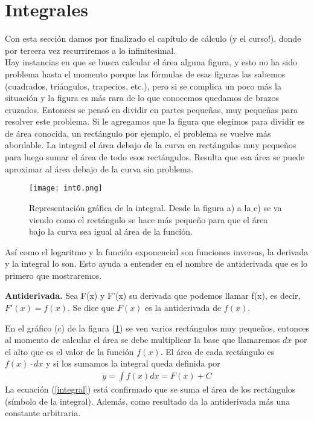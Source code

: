 \section{Integrales}

Con esta sección damos por finalizado el capítulo de cálculo (y el curso!), donde por tercera vez recurriremos a lo infinitesimal.\\

Hay instancias en que se busca calcular el área alguna figura, y esto no ha sido problema hasta el momento porque las fórmulas de esas figuras las sabemos (cuadrados, triángulos, trapecios, etc.), pero si se complica un poco más la situación y la figura es más rara de lo que conocemos quedamos de brazos cruzados. Entonces se pensó en dividir en partes pequeñas, muy pequeñas para resolver este problema. Si le agregamos que la figura que elegimos para dividir es de área conocida, un rectángulo por ejemplo, el problema se vuelve más abordable. La integral el área debajo de la curva en rectángulos muy pequeños para luego sumar el área de todo esos rectángulos. Resulta que esa área se puede aproximar al área debajo de la curva sin problema.

\begin{center}
\begin{figure}[h!]
\centering
\texttt{[image: int0.png]}
\caption[Representación de la integral.]{Representación gráfica de la integral. Desde la figura a) a la c) se va viendo como el rectángulo se hace más pequeño para que el área bajo la curva sea igual al área de la función.} \label{int0}
\end{figure}
\end{center}

Así como el logaritmo y la función exponencial son funciones inversas, la derivada y la integral lo son. Esto ayuda a entender en el nombre de antiderivada que es lo primero que mostraremos.
\begin{mydef}
\textbf{Antiderivada. } Sea F(x) y F'(x) su derivada que podemos llamar f(x), es decir, $F'(x)=f(x)$. Se dice que $F(x)$ es la antiderivada de $f(x)$.
\end{mydef}

En el gráfico (c) de la figura (\ref{int0}) se ven varios rectángulos muy pequeños, entonces al momento de calcular el área se debe multiplicar la base que llamaremos $dx$ por el alto que es el valor de la función $f(x)$. El área de cada rectángulo es $f(x)\cdot dx$ y si los sumamos la integral queda definida por 
\begin{eqnarray}
y=\int f(x)dx= F(x)+C
\label{integral}
\end{eqnarray}
La ecuación (\ref{integral}) está confirmado que se suma el área de los rectángulos (símbolo de la integral). Además, como resultado da la antiderivada más una constante arbitraria.

